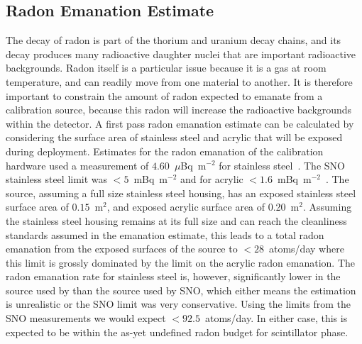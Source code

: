 \subsection{Radon Emanation Estimate}
\label{sec:emanation}
The decay of radon is part of the thorium and uranium decay chains, and its decay produces many radioactive daughter nuclei that are important radioactive backgrounds.
Radon itself is a particular issue because it is a gas at room temperature, and can readily move from one material to another.
It is therefore important to constrain the amount of radon expected to emanate from a calibration source, because this radon will increase the radioactive backgrounds within the detector.
A first pass radon emanation estimate can be calculated by considering the surface area of stainless steel and acrylic that will be exposed during deployment. 
Estimates for the radon emanation of the {\snop} calibration hardware used a measurement of $4.60$~$\mu$Bq~m$^{-2}$ for stainless steel~\cite{kormos:2015}. 
The SNO stainless steel limit was $< 5$~mBq~m$^{-2}$ and for acrylic $< 1.6$~mBq~m$^{-2}$~\cite{Liu:1993}. 
The source, assuming a full size stainless steel housing, has an exposed stainless steel surface area of $0.15$~m$^2$, and exposed acrylic surface area of 0.20~m$^2$. 
Assuming the stainless steel housing remains at its full size and can reach the cleanliness standards assumed in the {\snop} emanation estimate, this leads to a total radon emanation from the exposed surfaces of the source to $<28$~atoms/day where this limit is grossly dominated by the limit on the acrylic radon emanation. 
The radon emanation rate for stainless steel is, however, significantly lower in the source used by {\snop} than the source used by SNO, which either means the {\snop} estimation is unrealistic or the SNO limit was very conservative. 
Using the limits from the SNO measurements we would expect $<92.5$~atoms/day.
In either case, this is expected to be within the as-yet undefined {\snop} radon budget for scintillator phase.

